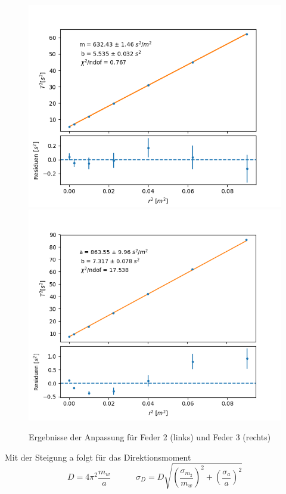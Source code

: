 \documentclass[12pt,a4paper]{article}
\begin{document}
\begin{figure}
\begin{center}
\includegraphics[scale=0.5]{Bilder/Feder2RegD}
\includegraphics[scale=0.5]{Bilder/Feder3RegD}
\end{center}
\caption{Ergebnisse der Anpassung für Feder 2 (links) und Feder 3 (rechts)}
\label{fig:RegressionenD}
\end{figure}





Mit der Steigung a folgt für das Direktionsmoment
\begin{equation}
D = 4 \pi^2 \frac{m_w}{a} \quad \quad \quad
\sigma_D= D \sqrt{(\frac{\sigma_{m_2}}{m_w})^2+(\frac{\sigma_a}{a})^2}
\end{equation}
\end{document}
